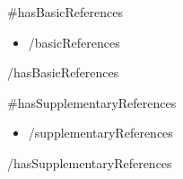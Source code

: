 \documentclass[a4paper]{article}
\begin{document}
{{#hasBasicReferences}}
\noindent\begin{minipage}{\textwidth}
\noindent \large  {}
\vspace{\parskip}
\begin{itemize}
{{#basicReferences}}
\item \normalsize {}
{{/basicReferences}}
\end{itemize}
\end{minipage}
\vspace{\parskip}
{{/hasBasicReferences}}

{{#hasSupplementaryReferences}}
\noindent\begin{minipage}{\textwidth}
\noindent \large  {}
\vspace{\parskip}
\begin{itemize}
{{#supplementaryReferences}}
\item \normalsize {}
{{/supplementaryReferences}}
\end{itemize}
\end{minipage}
\vspace{\parskip}
{{/hasSupplementaryReferences}}
\end{document}
